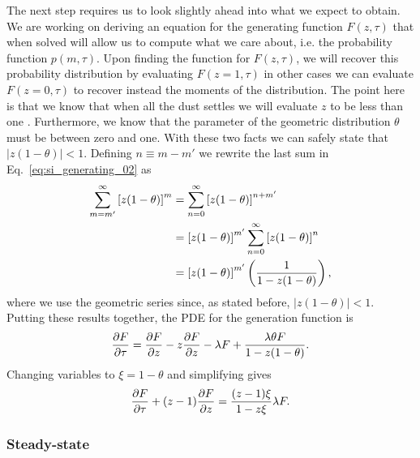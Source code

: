 The next step requires us to look slightly ahead into what we expect to obtain.
We are working on deriving an equation for the generating function $F(z, \tau)$
that when solved will allow us to compute what we care about, i.e. the
probability function $p(m, \tau)$. Upon finding the function for $F(z, \tau)$,
we will recover this probability distribution by evaluating $F(z=1, \tau)$ in
other cases we can evaluate $F(z=0, \tau)$ to recover instead the moments of the
distribution. The point here is that we know that when all the dust settles we
will evaluate $z$ to be less than one .
Furthermore, we know that the parameter of the geometric distribution $\theta$
must be between zero and one. With these two facts we can safely state that $| z
(1 - \theta) | < 1$. Defining $n \equiv m - m'$ we rewrite the last sum in
Eq.~\ref{eq:si_generating_02} as
\begin{align}
\sum_{m=m'}^{\infty} \left[z (1-\theta)\right]^{m} &= 
\sum_{n=0}^{\infty} \left[z (1-\theta)\right]^{n + m'} \\
&= \left[ z (1 - \theta) \right]^{m'} 
\sum_{n=0}^{\infty} \left[ z (1 - \theta) \right]^{n} \\
&= \left[ z (1 - \theta) \right]^{m'} 
\left( {1 \over 1 - z (1 - \theta)} \right),
\end{align}
where we use the geometric series since, as stated before, $| z (1 - \theta) | <
1$. Putting these results together, the PDE for the generation function is
\begin{equation}
{\partial F \over \partial \tau} = 
{\partial F \over\partial z}
- z {\partial F \over \partial z} - \lambda F
+ \frac{\lambda\theta F}{1-z(1-\theta)}.
\end{equation}
Changing variables to $\xi=1-\theta$ and simplifying gives
\begin{align}
{\partial F \over \partial \tau} + (z - 1) {\partial F \over \partial z} = 
\frac{(z-1)\xi}{1-z\xi}\lambda F.
\label{eq:1state_unreg_015}
\end{align}

\subsubsection{Steady-state}

